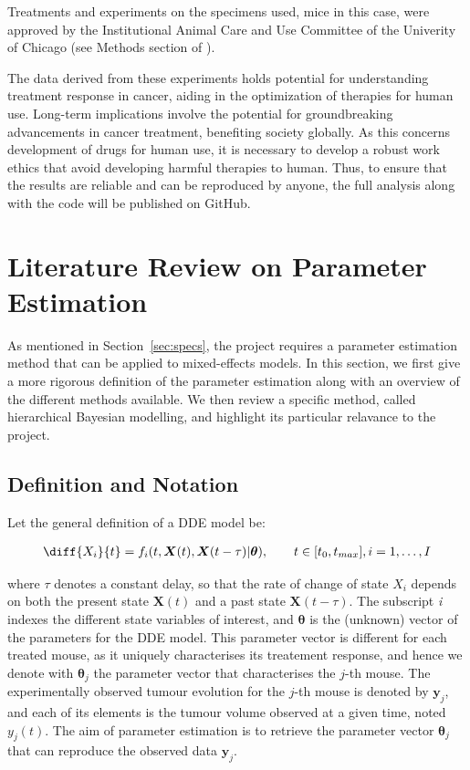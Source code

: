\documentclass[11pt]{article}
\begin{document}
Treatments and experiments on the specimens used, mice in this case, were approved by the Institutional Animal Care and Use Committee of the Univerity of Chicago (see Methods section of \cite{cbdil12}).

The data derived from these experiments holds potential for understanding treatment response in cancer, aiding in the optimization of therapies for human use. Long-term implications involve the potential for groundbreaking advancements in cancer treatment, benefiting society globally. As this concerns development of drugs for human use, it is necessary to develop a robust work ethics that avoid developing harmful therapies to human. Thus, to ensure that the results are reliable and can be reproduced by anyone, the full analysis along with the code will be published on GitHub.

\section{Literature Review on Parameter Estimation}\label{sec:littrev}

As mentioned in Section~\ref{sec:specs}, the project requires a parameter estimation method that can be applied to mixed-effects models. In this section, we first give a more rigorous definition of the parameter estimation along with an overview of the different methods available. We then review a specific method, called hierarchical Bayesian modelling, and highlight its particular relavance to the project. 

\subsection{Definition and Notation}
Let the general definition of a DDE model be: 

\begin{align*}
    \diff{X_i}{t} = f_i(t, \boldsymbol{X}(t), \boldsymbol{X}(t-\tau)| \boldsymbol{\theta}), \qquad t \in [t_0, t_{max}], i = 1, \ldots, I
\end{align*}

where $\tau$ denotes a constant delay, so that the rate of change of state $X_i$ depends on both the present state $\boldsymbol{X}(t)$ and a past state $\boldsymbol{X}(t-\tau)$. The subscript \textit{i} indexes the different state variables of interest, and $\boldsymbol{\theta}$ is the (unknown) vector of the parameters for the DDE model. This parameter vector is different for each treated mouse, as it uniquely characterises its treatement response, and hence we denote with $\boldsymbol{\theta}_j$ the parameter vector that characterises the $j$-th mouse. The experimentally observed tumour evolution for the $j$-th mouse is denoted by $\boldsymbol{y}_j$, and each of its elements is the tumour volume observed at a given time, noted $y_{j}(t)$. The aim of parameter estimation is to retrieve the parameter vector $\boldsymbol{\theta}_j$ that can reproduce the observed data $\boldsymbol{y}_j$. 
\end{document}
